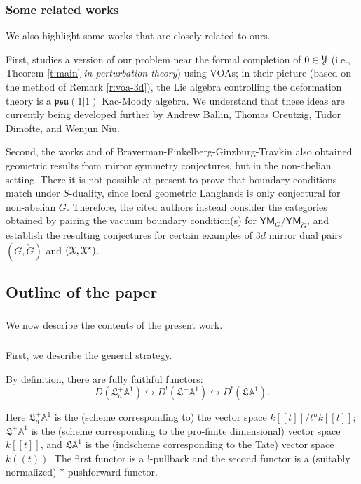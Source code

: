 \documentclass[reqno,11pt]{amsart}
\numberwithin{equation}{subsection}
\theoremstyle{remark}
\newcommand{\into}{\hookrightarrow}
\newcommand{\bA}{{\mathbb A}}
\newcommand{\sX}{{\EuScript X}}
\newcommand{\sY}{{\EuScript Y}}
\newcommand{\fL}{{\mathfrak L}}
\newcommand{\YM}{\mathsf{YM}}
\begin{document}
\subsubsection{Some related works}

We also highlight some works that are closely related to ours.

First, \cite{ccg} studies a version of our problem
near the formal completion of $0 \in \sY$ (i.e., Theorem \ref{t:main} 
\emph{in perturbation theory}) using VOAs; in their picture (based on the
method of Remark \ref{r:voa-3d}), the
Lie algebra controlling the deformation theory is a 
$\mathfrak{psu}(1|1)$ Kac-Moody algebra. We understand that these ideas 
are currently being developed further by Andrew Ballin, Thomas Creutzig,
Tudor Dimofte, and Wenjun Niu.

Second, the works \cite{bfgt} and \cite{bft} 
of Braverman-Finkelberg-Ginzburg-Travkin also obtained geometric results from 
mirror symmetry conjectures, but in the non-abelian setting. 
There it is not possible at present
to prove that boundary conditions match under $S$-duality, since
local geometric Langlands is only conjectural for non-abelian $G$.
Therefore, the cited authors instead consider the categories obtained by 
pairing the vacuum boundary condition(s) for
$\YM_G$/$\YM_{\check{G}}$, and
establish the resulting conjectures for certain examples of 
$3d$ mirror dual pairs $(G,\check{G})$ and $(\sX,\sX^{\star})$. 

\subsection{Outline of the paper}

\subsubsection{} We now describe the contents of the present work.

\subsubsection{}\label{ss:intro-strategy}

First, we describe the general strategy. 

By definition, there are fully faithful functors:
%
\[
D(\fL_n^+\bA^1) \into D^!(\fL^+ \bA^1) \into D^!(\fL \bA^1).
\]

\noindent Here $\fL_n^+\bA^1$ is the (scheme corresponding to) 
the vector space $k[[t]]/t^nk[[t]]$; $\fL^+ \bA^1$ is the
(scheme corresponding to the pro-finite dimensional) vector 
space $k[[t]]$, and $\fL\bA^1$ is the (indscheme corresponding to
the Tate) vector space $k((t))$. The first functor is a $!$-pullback
and the second functor is a (suitably normalized) $*$-pushforward functor.
\end{document}
